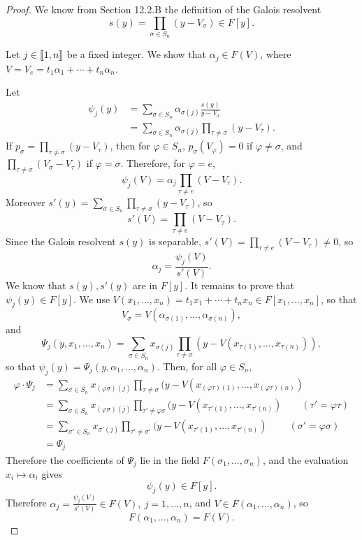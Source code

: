 \documentclass[11pt,a4paper]{article}
\def\gcro{\mbox{[\hspace{-.15em}[}}%
\def\dcro{\mbox{]\hspace{-.15em}]}}
\begin{document}
\begin{proof}
We know from Section 12.2.B the definition of the Galois resolvent
$$s(y) = \prod_{\sigma \in S_n} (y - V_\sigma) \in F[y].$$

Let $j \in \gcro 1, n\dcro$ be a fixed integer. We show that $\alpha_j \in F(V)$, where $V = V_e = t_1 \alpha_1+ \cdots + t_n \alpha_n$.

Let 
\begin{align*}
\psi_j(y) &= \sum_{\sigma \in S_n} \alpha_{\sigma(j)} \frac{s(y)}{y - V_\sigma}\\
&= \sum_{\sigma \in S_n} \alpha_{\sigma(j)} \prod_{\tau \ne \sigma} (y - V_\tau).
\end{align*}
If $p_\sigma =  \prod_{\tau \ne \sigma} (y - V_\tau)$, then for $\varphi \in S_n$, $p_\sigma(V_\varphi) = 0$ if $\varphi \ne \sigma$, and $\prod_{\tau \ne \sigma} (V_\sigma - V_\tau)$ if $\varphi = \sigma$. Therefore, for $\varphi = e$, 
$$\psi_j(V) = \alpha_j \prod_{\tau \ne e} (V - V_\tau).$$
Moreover $s'(y) = \sum_{\sigma \in S_n} \prod_{\tau \ne \sigma} (y - V_\tau)$, so
$$s'(V)= \prod_{\tau \ne e} (V - V_\tau).$$
Since the Galois resolvent $s(y)$ is separable, $s'(V)= \prod_{\tau\ne e} (V - V_\tau) \ne 0$, so
$$\alpha_j = \frac{\psi_j(V)}{s'(V)}.$$
We know that $s(y), s'(y)$ are in $F[y]$. It remains to prove that $\psi_j(y) \in F[y]$. 
We use $V(x_1,\ldots,x_n) = t_1x_1+\cdots + t_nx_n \in F[x_1,\ldots,x_n]$, so that 
$$V_\sigma  = V(\alpha_{\sigma(1)},\ldots,\alpha_{\sigma(n)}),$$ 
and
$$\Psi_j(y,x_1,\ldots,x_n) =  \sum_{\sigma \in S_n} x_{\sigma(j)} \prod_{\tau \ne \sigma} (y - V(x_{\tau(1)},\ldots,x_{\tau(n)})),$$
so that $\psi_j(y) = \Psi_j(y,\alpha_1,\ldots,\alpha_n)$.
Then, for all $\varphi \in S_n$,
\begin{align*}
\varphi \cdot \Psi_j &= \sum_{\sigma \in S_n} x_{(\varphi \sigma)(j)} \prod_{\tau \ne \sigma} (y - V(x_{(\varphi \tau)(1)},\ldots,x_{(\varphi \tau)(n)})\\
&=\sum_{\sigma \in S_n} x_{(\varphi \sigma)(j)} \prod_{\tau' \ne \varphi \sigma} (y - V(x_{\tau'(1)},\ldots,x_{\tau'(n)}) \qquad (\tau' = \varphi \tau) \\
&= \sum_{\sigma' \in S_n} x_{\sigma'(j)} \prod_{\tau' \ne \sigma'} (y - V(x_{\tau'(1)},\ldots,x_{\tau'(n)}) \ \qquad (\sigma' = \varphi \sigma)\\
&= \Psi_j
\end{align*}
Therefore the coefficients of $\Psi_j$ lie in the field $F(\sigma_1,\ldots,\sigma_n)$, and the evaluation $x_i \mapsto \alpha_i$ gives
$$\psi_j(y) \in F[y].$$
Therefore $\alpha_j = \frac{\psi_j(V)}{s'(V)} \in F(V),\ j=1,\ldots,n$, and $V \in F(\alpha_1,\ldots,\alpha_n)$, so
$$F(\alpha_1,\ldots,\alpha_n) = F(V).$$
\end{proof}
\end{document}
